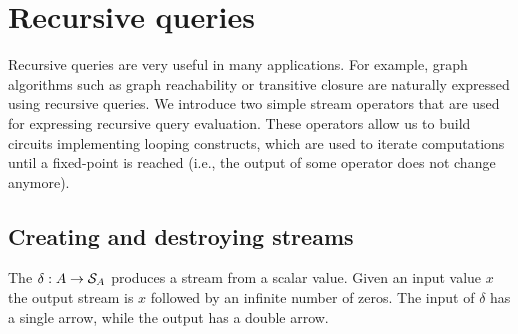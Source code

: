 \section{Recursive queries}\label{sec:recursion}

Recursive queries are very useful in many applications.  For
example, graph algorithms such as graph reachability or transitive
closure are naturally expressed using recursive queries.  We introduce
two simple \dbsp stream operators that are used for expressing
recursive query evaluation.  These operators allow us to build
circuits implementing looping constructs, which are used to iterate
computations until a fixed-point is reached (i.e., the output of some
operator does not change anymore).

\subsection{Creating and destroying streams}



The  $\delta : A \rightarrow \mathcal{S}_{A}$
produces a stream from a scalar value.  Given an input value $x$ the
output stream is $x$ followed by an infinite number of zeros.  The
input of $\delta$ has a single arrow, while the output has a double
arrow.

\begin{center}
\end{center}

